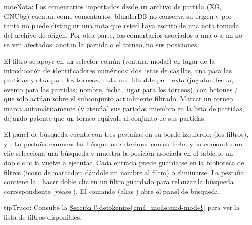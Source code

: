 \documentclass[letterpaper,10pt,spanish]{sphinxmanual}
\begin{document}
\begin{sphinxadmonition}{note}{Nota:}
\sphinxAtStartPar
Los comentarios importados desde un archivo de partida (XG, GNUbg) cuentan como comentarios: blunderDB no conserva su origen y por tanto no puede distinguir una nota que usted haya escrito de una nota tomada del archivo de origen. Por otra parte, los comentarios asociados a una  o a un  no se ven afectados: anotan la partida o el torneo, no sus posiciones.
\end{sphinxadmonition}

\sphinxAtStartPar
El filtro  se apoya en un selector común (ventana modal) en lugar de la introducción de identificadores numéricos: dos listas de casillas, una para las partidas y otra para los torneos, cada una filtrable por texto (jugador, fecha, evento para las partidas; nombre, fecha, lugar para los torneos), con botones  /  que solo actúan sobre el subconjunto actualmente filtrado. Marcar un torneo marca automáticamente (y atenúa) sus partidas miembro en la lista de partidas, dejando patente que un torneo equivale al conjunto de sus partidas.

\sphinxAtStartPar
El panel de búsqueda cuenta con tres pestañas en su borde izquierdo:  (los filtros),  y . La pestaña  enumera las búsquedas anteriores con su fecha y su comando: un clic selecciona una búsqueda y muestra la posición asociada en el tablero, un doble clic la vuelve a ejecutar. Cada entrada puede guardarse en la biblioteca de filtros (icono de marcador, dándole un nombre al filtro) o eliminarse. La pestaña  contiene la : hacer doble clic en un filtro guardado para relanzar la búsqueda correspondiente (véase {\hyperref[\detokenize{annexe_filtres:annexe-filtres}]{}}). El comando  (alias ) abre el panel de búsqueda.

\begin{sphinxadmonition}{tip}{Truco:}
\sphinxAtStartPar
Consulte la \hyperref[\detokenize{cmd_mode:cmd-mode}]{Sección \ref{\detokenize{cmd_mode:cmd-mode}}} para ver la lista de filtros disponibles.
\end{sphinxadmonition}
\end{document}
